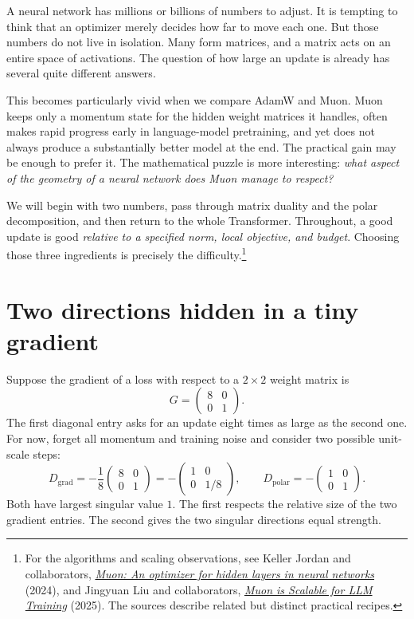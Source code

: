 
A neural network has millions or billions of numbers to adjust.  It is tempting to think that an optimizer merely decides how far to move each one.  But those numbers do not live in isolation.  Many form matrices, and a matrix acts on an entire space of activations.  The question of how large an update is already has several quite different answers.

This becomes particularly vivid when we compare AdamW and Muon.  Muon keeps only a momentum state for the hidden weight matrices it handles, often makes rapid progress early in language-model pretraining, and yet does not always produce a substantially better model at the end.  The practical gain may be enough to prefer it.  The mathematical puzzle is more interesting: \emph{what aspect of the geometry of a neural network does Muon manage to respect?}

We will begin with two numbers, pass through matrix duality and the polar decomposition, and then return to the whole Transformer.  Throughout, a good update is good \emph{relative to a specified norm, local objective, and budget}.  Choosing those three ingredients is precisely the difficulty.\footnote{For the algorithms and scaling observations, see Keller Jordan and collaborators, \href{https://kellerjordan.github.io/posts/muon/}{\emph{Muon: An optimizer for hidden layers in neural networks}} (2024), and Jingyuan Liu and collaborators, \href{https://arxiv.org/abs/2502.16982}{\emph{Muon is Scalable for LLM Training}} (2025).  The sources describe related but distinct practical recipes.}

\section{Two directions hidden in a tiny gradient}

Suppose the gradient of a loss with respect to a \(2\times2\) weight matrix is
\[
 G=\begin{pmatrix}8&0\\0&1\end{pmatrix}.
\]
The first diagonal entry asks for an update eight times as large as the second one.  For now, forget all momentum and training noise and consider two possible unit-scale steps:
\[
 D_{\mathrm{grad}}=
 -\frac{1}{8}
 \begin{pmatrix}8&0\\0&1\end{pmatrix}
 =-\begin{pmatrix}1&0\\0&1/8\end{pmatrix},
 \qquad
 D_{\mathrm{polar}}=-\begin{pmatrix}1&0\\0&1\end{pmatrix}.
\]
Both have largest singular value \(1\).  The first respects the relative size of the two gradient entries.  The second gives the two singular directions equal strength.

